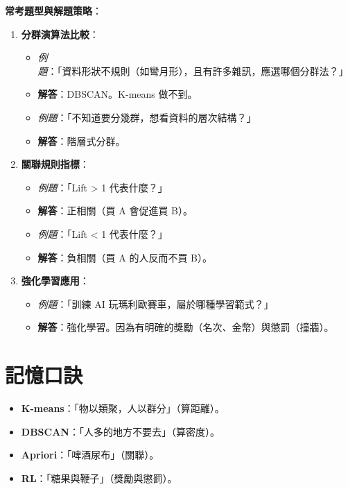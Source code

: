 \documentclass[
  letterpaper,
  DIV=11,
  numbers=noendperiod]{scrreprt}
\providecommand{\tightlist}{%
  \setlength{\itemsep}{0pt}\setlength{\parskip}{0pt}}
\begin{document}
\textbf{常考題型與解題策略}：

\begin{enumerate}
\def\labelenumi{\arabic{enumi}.}
\tightlist
\item
  \textbf{分群演算法比較}：

  \begin{itemize}
  \tightlist
  \item
    \emph{例題}：「資料形狀不規則（如彎月形），且有許多雜訊，應選哪個分群法？」
  \item
    \textbf{解答}：DBSCAN。K-means 做不到。
  \item
    \emph{例題}：「不知道要分幾群，想看資料的層次結構？」
  \item
    \textbf{解答}：階層式分群。
  \end{itemize}
\item
  \textbf{關聯規則指標}：

  \begin{itemize}
  \tightlist
  \item
    \emph{例題}：「Lift \textgreater{} 1 代表什麼？」
  \item
    \textbf{解答}：正相關（買 A 會促進買 B）。
  \item
    \emph{例題}：「Lift \textless{} 1 代表什麼？」
  \item
    \textbf{解答}：負相關（買 A 的人反而不買 B）。
  \end{itemize}
\item
  \textbf{強化學習應用}：

  \begin{itemize}
  \tightlist
  \item
    \emph{例題}：「訓練 AI 玩瑪利歐賽車，屬於哪種學習範式？」
  \item
    \textbf{解答}：強化學習。因為有明確的獎勵（名次、金幣）與懲罰（撞牆）。
  \end{itemize}
\end{enumerate}

\section{記憶口訣}\label{ux8a18ux61b6ux53e3ux8a23-5}

\begin{itemize}
\tightlist
\item
  \textbf{K-means}：「物以類聚，人以群分」（算距離）。
\item
  \textbf{DBSCAN}：「人多的地方不要去」（算密度）。
\item
  \textbf{Apriori}：「啤酒尿布」（關聯）。
\item
  \textbf{RL}：「糖果與鞭子」（獎勵與懲罰）。
\end{itemize}
\end{document}

